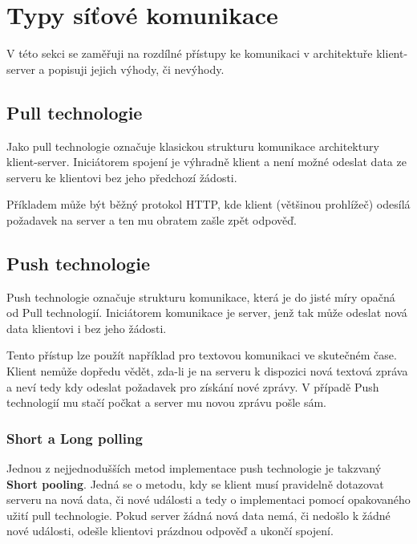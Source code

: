 
\section{Typy síťové komunikace}\label{sec:technologieProKomunikaciSeServerem}

V této sekci se zaměřuji na rozdílné přístupy ke komunikaci v architektuře klient-server a popisuji jejich výhody, či nevýhody.

\subsection{Pull technologie}\label{subsec:pullTechnologie}

Jako pull technologie označuje klasickou strukturu komunikace architektury klient-server.
Iniciátorem spojení je výhradně klient a není možné odeslat data ze serveru ke klientovi bez jeho předchozí žádosti.

Příkladem může být běžný protokol \gls{HTTP}, kde klient (většinou prohlížeč) odesílá požadavek na server a ten mu obratem zašle zpět odpověď.~\cite{pushpull:about}

\subsection{Push technologie}\label{subsec:pushTechnologie}

Push technologie označuje strukturu komunikace, která je do jisté míry opačná od Pull technologií.
Iniciátorem komunikace je server, jenž tak může odeslat nová data klientovi i bez jeho žádosti.

Tento přístup lze použít například pro textovou komunikaci ve skutečném čase.
Klient nemůže dopředu vědět, zda-li je na serveru k dispozici nová textová zpráva a neví tedy kdy odeslat požadavek pro získání nové zprávy.
V případě Push technologií mu stačí počkat a server mu novou zprávu pošle sám.~\cite{pushpull:about}

\subsubsection{Short a Long polling}\label{subsubsec:pooling}

Jednou z nejjednodušších metod implementace push technologie je takzvaný \textbf{Short pooling}.
Jedná se o metodu, kdy se klient musí pravidelně dotazovat serveru na nová data, či nové události a tedy o implementaci pomocí opakovaného užití pull technologie.
Pokud server žádná nová data nemá, či nedošlo k žádné nové události, odešle klientovi prázdnou odpověď a ukončí spojení.

